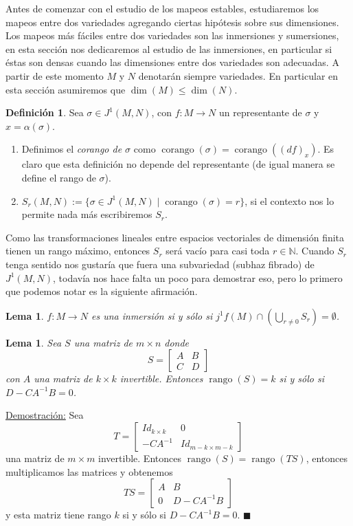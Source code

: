 \documentclass{report}
\newtheorem{lem}[theorem]{Lema}
\theoremstyle{definition}
\newtheorem{defi}[theorem]{Definici\'on}
\DeclareMathOperator{\rango}{rango}
\DeclareMathOperator{\cor}{corango}
\begin{document}
Antes de comenzar con el estudio de los mapeos estables, estudiaremos los mapeos entre dos variedades agregando ciertas hip\'otesis sobre sus dimensiones. Los mapeos m\'as f\'aciles entre dos variedades son las inmersiones y sumersiones, en esta secci\'on nos dedicaremos al estudio de las inmersiones, en particular si \'estas son densas cuando las dimensiones entre dos variedades son adecuadas. A partir de este momento $M$ y $N$ denotar\'an siempre variedades. En particular en esta secci\'on asumiremos que $\dim (M) \leq \dim (N)$.

\begin{defi}
Sea $\sigma \in J^1 (M,N)$, con $f:M \to N$ un representante de $\sigma$ y $x = \alpha (\sigma)$.\begin{enumerate}

 \item Definimos el \textit{corango de $\sigma$} como $\cor (\sigma) = \cor ( (df)_x)$. Es claro que esta definici\'on no depende del representante (de igual manera se define el rango de $\sigma$).
 \item $ S_r(M,N) := \{ \sigma \in J^1 (M,N) \mid \cor (\sigma) = r \}$, si el contexto nos lo permite nada m\'as escribiremos $S_r$.
 \end{enumerate}
\end{defi}

Como las transformaciones lineales entre espacios vectoriales de dimensi\'on finita tienen un rango m\'aximo, entonces $S_r$ ser\'a vac\'io para casi toda $r \in \mathbb{N}$. Cuando $S_r$ tenga sentido nos gustar\'ia que fuera una subvariedad (subhaz fibrado) de $J^1 (M,N)$, todav\'ia nos hace falta un poco para demostrar eso, pero lo primero que podemos notar es la siguiente afirmaci\'on.

\begin{lem}
 $f: M \to N$ es una inmersi\'on si y s\'olo si $j^1 f(M) \cap \left( \bigcup\limits_{r \neq 0} S_r \right) = \emptyset$.
\end{lem}

\begin{lem}
Sea $S $ una matriz de $m \times n$ donde \[
S =
  \begin{bmatrix}
   A & B\\
   C & D
  \end{bmatrix}
\]
con $A$ una matriz de $k \times k$ invertible. Entonces $ \rango (S) = k$ si y s\'olo si $D- C A^{-1} B = 0$.
\end{lem}
 
\underline{Demostraci\'on:} Sea \[
T=
  \begin{bmatrix}
    Id_{k \times k} & 0 \\
    -C A^{-1} & Id_{ m-k \times m-k}
  \end{bmatrix}
\]
una matriz de $m \times m$ invertible. Entonces $\rango (S) = \rango (TS)$, entonces multiplicamos las matrices y obtenemos \[
TS=
  \begin{bmatrix}
    A & B \\
    0 & D - C A^{-1} B
  \end{bmatrix}
\]
y esta matriz tiene rango $k$ si y s\'olo si $D- CA^{-1}B = 0$. $\blacksquare$
\end{document}
